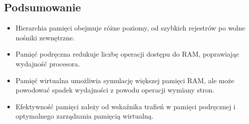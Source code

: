 \subsection{Podsumowanie}
\begin{itemize}
    \item Hierarchia pamięci obejmuje różne poziomy, od szybkich rejestrów po wolne nośniki zewnętrzne.
    \item Pamięć podręczna redukuje liczbę operacji dostępu do RAM, poprawiając wydajność procesora.
    \item Pamięć wirtualna umożliwia symulację większej pamięci RAM, ale może powodować spadek wydajności z powodu operacji wymiany stron.
    \item Efektywność pamięci zależy od wskaźnika trafień w pamięci podręcznej i optymalnego zarządzania pamięcią wirtualną.
\end{itemize}
